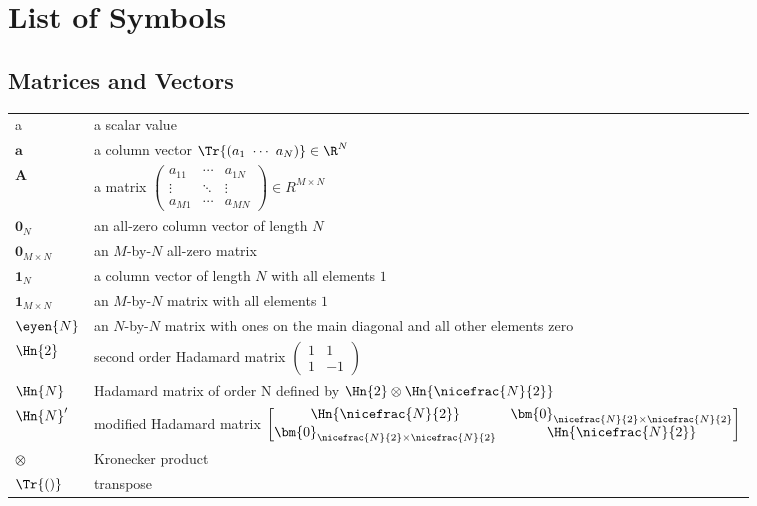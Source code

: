 \chapter*{List of Symbols}
\section*{Matrices and Vectors}
\begin{tabular}{ p{2cm} l }
    a           & a scalar value \\

    $\bm{a}$    & a column vector $\Tr{\left( a_1 \ \cdots \ a_N \right)} \in \R^{N}$ \\

    $\bm{A}$    & a matrix
    $\begin{pmatrix}
        a_{11} & \cdots & a_{1N} \\
        \vdots & \ddots & \vdots \\
        a_{M1} & \cdots & a_{MN}
    \end{pmatrix} \in R^{M \times N}
    $ \\

    $\bm{0}_N$  & an all-zero column vector of length $N$ \\
    $\bm{0}_{M \times N}$    & an $M$-by-$N$ all-zero matrix \\
    $\bm{1}_N$  & a column vector of length $N$ with all elements $1$ \\
    $\bm{1}_{M \times N}$    & an $M$-by-$N$ matrix with all elements $1$ \\

    $\eyen{N}$  & an $N$-by-$N$ matrix with ones on the main diagonal and all other elements zero \\

    $\Hn{2}$    & second order Hadamard matrix
    $
    \begin{pmatrix}
        1 & 1 \\
        1 & -1
    \end{pmatrix}
    $ \\

    $\Hn{N}$    & Hadamard matrix of order N defined by $\Hn{2} \otimes \Hn{\nicefrac{N}{2}}$ \\

    $\Hn{N}'$   & modified Hadamard matrix
    $
    \begin{bmatrix}
        \Hn{\nicefrac{N}{2}} & \bm{0}_{\nicefrac{N}{2} \times \nicefrac{N}{2}} \\
        \bm{0}_{\nicefrac{N}{2} \times \nicefrac{N}{2}} & \Hn{\nicefrac{N}{2}}
    \end{bmatrix}
    $ \\

    $\otimes$   & Kronecker product \\
    $\Tr{()}$   & transpose


\end{tabular}


